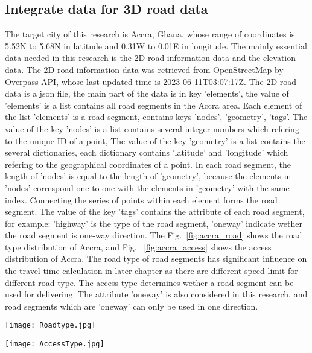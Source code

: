 \documentclass[final-report]{report-template}
\begin{document}
\subsection {Integrate data for 3D road data}
The target city of this research is Accra, Ghana, whose range of coordinates is 5.52N to 5.68N in latitude and 0.31W to 0.01E in longitude.
The mainly essential data needed in this research is the 2D road information data and the elevation data. 
The 2D road information data was retrieved from OpenStreetMap by Overpass API, whose last updated time is 2023-06-11T03:07:17Z.
The 2D road data is a json file, the main part of the data is in key 'elements', the value of 'elements' is a list contains all road segments in the Accra area.
Each element of the list 'elements' is a road segment, contains keys 'nodes', 'geometry', 'tags'. 
The value of the key 'nodes' is a list contains several integer numbers which refering to the unique ID of a point, 
The value of the key 'geometry' is a list contains the several dictionaries, each dictionary contains 'latitude' and 'longitude' which refering to the geographical coordinates of a point.
In each road segment, the length of 'nodes' is equal to the length of 'geometry', because the elements in 'nodes' correspond one-to-one with the elements in 'geometry' with the same index.
Connecting the series of points within each element forms the road segment.
The value of the key 'tags' contains the attribute of each road segment, for example: 'highway' is the type of the road segment, 'oneway' indicate wether the road segment is one-way direction.
The Fig.~\ref{fig:accra_road} shows the road type distribution of Accra, and Fig.~ \ref{fig:accra_access} shows the access distribution of Accra. 
The road type of road segments has significant influence on the travel time calculation in later chapter as there are different speed limit for different road type.
The access type determines wether a road segment can be used for delivering. The attribute 'oneway' is also considered in this research, and road segments which are 'oneway' can only be used in one direction.
\begin{figure*}[htbp]
    \centering
    \begin{minipage}[t]{0.48\textwidth}
    \centering
    \texttt{[image: Roadtype.jpg]}
    \caption{\label{fig:accra_road} The road types of Accra}
    \end{minipage}
    \begin{minipage}[t]{0.48\textwidth}
    \centering
    \texttt{[image: AccessType.jpg]}
    \caption{\label{fig:accra_access} The access types of Accra}
    \end{minipage}
\end{figure*}
\end{document}
